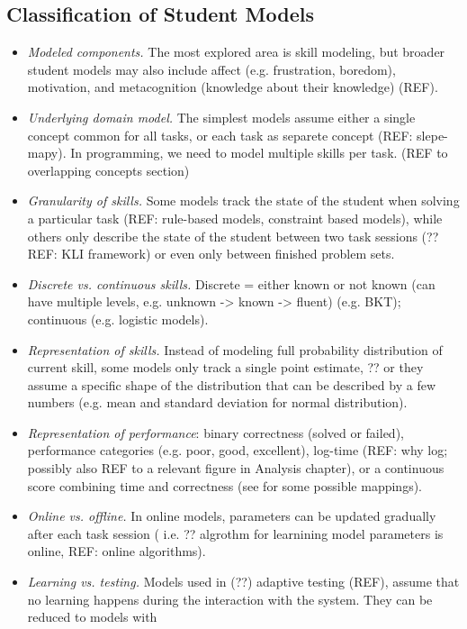 \subsection{Classification of Student Models}

\begin{itemize}
\item \emph{Modeled components.}
The most explored area is skill modeling, but broader student models may also
include affect (e.g. frustration, boredom), motivation, and metacognition
(knowledge about their knowledge) (REF).
\item \emph{Underlying domain model.}
The simplest models assume either a single concept common for all tasks,
or each task as separete concept (REF: slepe-mapy). In programming,
we need to model multiple skills per task.
(REF to overlapping concepts section)
\item \emph{Granularity of skills.}
Some models track the state of the student when solving a particular task
(REF: rule-based models, constraint based models), while others
only describe the state of the student between two task sessions
(??REF: KLI framework) or even only between finished problem sets.
\item \emph{Discrete vs. continuous skills.}
Discrete = either known or not known (can have multiple levels, e.g.
unknown -> known -> fluent) (e.g. BKT); continuous (e.g. logistic models).
\cite{pelanek-learner-modeling}
\item \emph{Representation of skills.}
Instead of modeling full probability distribution of current skill, some models
only track a single point estimate,
?? or they assume a specific shape of the distribution that can be described by
a few numbers (e.g. mean and standard deviation for normal distribution).
\item \emph{Representation of performance}:
  binary correctness (solved or failed),
  performance categories (e.g. poor, good, excellent),
  log-time (REF: why log; possibly also REF to a relevant figure in Analysis chapter),
  or a continuous score combining time and correctness
  (see \cite[p.106]{rihak-phd} for some possible mappings).
\item \emph{Online vs. offline.}
In online models, parameters can be updated gradually after each task session
( i.e. ?? algrothm for learnining model parameters is online, REF: online algorithms).
\item \emph{Learning vs. testing.}
Models used in (??) adaptive testing (REF), assume that no learning happens
during the interaction with the system. They can be reduced to models with

\end{itemize}
